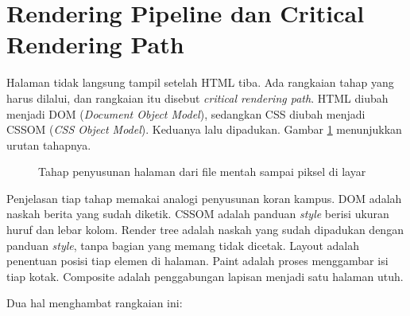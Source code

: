 \section{Rendering Pipeline dan Critical Rendering Path}

Halaman tidak langsung tampil setelah HTML tiba. Ada rangkaian tahap yang harus
dilalui, dan rangkaian itu disebut \textit{critical rendering path}. HTML
diubah menjadi DOM (\textit{Document Object Model}), sedangkan CSS diubah
menjadi CSSOM (\textit{CSS Object Model}). Keduanya lalu dipadukan. Gambar
\ref{fig:crp} menunjukkan urutan tahapnya.

\begin{figure}[ht]
  \centering
  \caption{Tahap penyusunan halaman dari file mentah sampai piksel di layar}
  \label{fig:crp}
\end{figure}

Penjelasan tiap tahap memakai analogi penyusunan koran kampus. DOM adalah
naskah berita yang sudah diketik. CSSOM adalah panduan \textit{style} berisi
ukuran huruf dan lebar kolom. Render tree
adalah naskah yang sudah dipadukan dengan panduan \textit{style}, tanpa bagian
yang memang tidak dicetak. Layout adalah penentuan posisi
tiap elemen di halaman. Paint adalah proses menggambar isi tiap kotak.
Composite adalah penggabungan lapisan menjadi satu halaman utuh.

Dua hal menghambat rangkaian ini:

